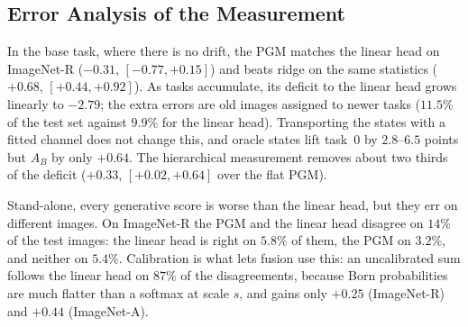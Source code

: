 \subsection{Error Analysis of the Measurement}
\label{sec:errors}
In the base task, where there is no drift, the PGM matches the linear head on
ImageNet-R ($-0.31$, $[-0.77,+0.15]$) and beats ridge on the same statistics
($+0.68$, $[+0.44,+0.92]$). As tasks accumulate, its deficit to the linear head
grows linearly to $-2.79$; the extra errors are old images assigned to newer
tasks ($11.5\%$ of the test set against $9.9\%$ for the linear head).
Transporting the states with a fitted channel does not change this, and oracle
states lift task~0 by $2.8$--$6.5$ points but $A_B$ by only $+0.64$. The
hierarchical measurement removes about two thirds of the deficit ($+0.33$,
$[+0.02,+0.64]$ over the flat PGM).

Stand-alone, every generative score is worse than the linear head, but they
err on different images. On ImageNet-R the PGM and the linear head disagree on
$14\%$ of the test images: the linear head is right on $5.8\%$ of them, the PGM
on $3.2\%$, and neither on $5.4\%$. Calibration is what lets fusion use this:
an uncalibrated sum follows the linear head on $87\%$ of the disagreements,
because Born probabilities are much flatter than a softmax at scale $s$, and
gains only $+0.25$ (ImageNet-R) and $+0.44$ (ImageNet-A).
